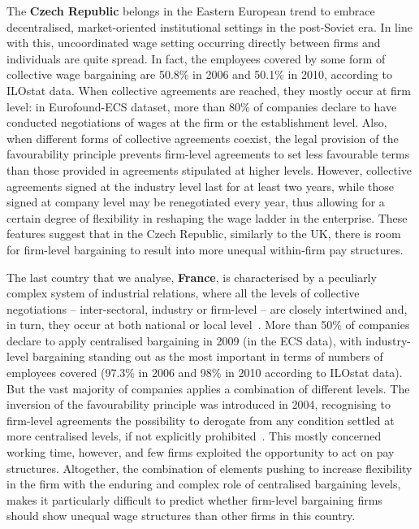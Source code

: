 \documentclass[12pt]{article}
\begin{document}
The \textbf{Czech Republic} belongs in the Eastern European trend to embrace decentralised, market-oriented institutional settings in the post-Soviet era.
In line with this, uncoordinated wage setting occurring directly between firms and individuals are quite spread. In fact, the employees covered by some form of collective wage bargaining are 50.8\% in 2006 and 50.1\% in 2010, according to ILOstat data. When collective agreements are reached, they mostly occur at firm level: in Eurofound-ECS dataset, more than 80\% of companies declare to have conducted negotiations of wages at the firm or the establishment level. Also, when different forms of collective agreements coexist, the legal provision of the favourability principle prevents firm-level agreements to set less favourable terms than those provided in agreements stipulated at higher levels. However, collective agreements signed at the industry level last for at least two years, while those signed at company level may be renegotiated every year, thus allowing for a certain degree of flexibility in reshaping the wage ladder in the enterprise. These features suggest that in the Czech Republic, similarly to the UK, there is room for firm-level bargaining to result into more unequal within-firm pay structures.

The last country that we analyse, \textbf{France}, is characterised by a peculiarly complex system of industrial relations, where all the levels of collective negotiations -- inter-sectoral, industry or firm-level -- are closely intertwined and, in turn, they occur at both national or local level~\citep{fulton.2013,fulton.2015}.
More than 50\% of companies declare to apply centralised bargaining in 2009 (in the ECS data), with industry-level bargaining standing out as the most important in terms of numbers of employees covered (97.3\% in 2006 and 98\% in 2010 according to ILOstat data). But the vast majority of companies applies a combination of different levels.
The inversion of the favourability principle was introduced in 2004, recognising to firm-level agreements the possibility to derogate from any condition settled at more centralised levels, if not explicitly prohibited~\citep{keune2011decentralizing}.
This mostly concerned working time, however, and few firms exploited the opportunity to act on pay structures. Altogether, the combination of elements pushing to increase flexibility in the firm with the enduring and complex role of centralised bargaining levels, makes it particularly difficult to predict whether firm-level bargaining firms should show unequal wage structures than other firms in this country.
\end{document}
